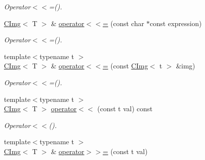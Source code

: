 \begin{DoxyCompactItemize}
\begin{DoxyCompactList}\small\item\em Operator$<$$<$=(). \item\end{DoxyCompactList}\item 
\hypertarget{structcimg__library_1_1CImg_ad8976dac7393356b0eae1224900d1790}{
\hyperlink{structcimg__library_1_1CImg}{CImg}$<$ T $>$ \& \hyperlink{structcimg__library_1_1CImg_ad8976dac7393356b0eae1224900d1790}{operator$<$$<$=} (const char $\ast$const expression)}
\label{structcimg__library_1_1CImg_ad8976dac7393356b0eae1224900d1790}

\begin{DoxyCompactList}\small\item\em Operator$<$$<$=(). \item\end{DoxyCompactList}\item 
\hypertarget{structcimg__library_1_1CImg_af79f523939d682a0b0e8a9b6f1593ecb}{
{\footnotesize template$<$typename t $>$ }\\\hyperlink{structcimg__library_1_1CImg}{CImg}$<$ T $>$ \& \hyperlink{structcimg__library_1_1CImg_af79f523939d682a0b0e8a9b6f1593ecb}{operator$<$$<$=} (const \hyperlink{structcimg__library_1_1CImg}{CImg}$<$ t $>$ \&img)}
\label{structcimg__library_1_1CImg_af79f523939d682a0b0e8a9b6f1593ecb}

\begin{DoxyCompactList}\small\item\em Operator$<$$<$=(). \item\end{DoxyCompactList}\item 
\hypertarget{structcimg__library_1_1CImg_adc3d9516cd5e03b9472e76e25b973fdd}{
{\footnotesize template$<$typename t $>$ }\\\hyperlink{structcimg__library_1_1CImg}{CImg}$<$ T $>$ \hyperlink{structcimg__library_1_1CImg_adc3d9516cd5e03b9472e76e25b973fdd}{operator$<$$<$} (const t val) const }
\label{structcimg__library_1_1CImg_adc3d9516cd5e03b9472e76e25b973fdd}

\begin{DoxyCompactList}\small\item\em Operator$<$$<$(). \item\end{DoxyCompactList}\item 
\hypertarget{structcimg__library_1_1CImg_a741fda11b9c4bc6ce88db78425724427}{
{\footnotesize template$<$typename t $>$ }\\\hyperlink{structcimg__library_1_1CImg}{CImg}$<$ T $>$ \& \hyperlink{structcimg__library_1_1CImg_a741fda11b9c4bc6ce88db78425724427}{operator$>$$>$=} (const t val)}
\label{structcimg__library_1_1CImg_a741fda11b9c4bc6ce88db78425724427}


\end{DoxyCompactItemize}
